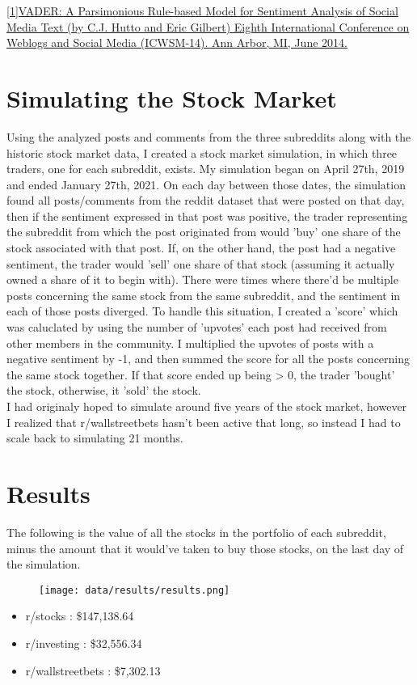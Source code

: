 \documentclass[11pt]{article}
\begin{document}
   \begin{small}
   \href{https://ojs.aaai.org/index.php/ICWSM/article/view/14550/14399}
   {[1]VADER: A Parsimonious Rule-based Model for Sentiment Analysis of Social Media Text
   (by C.J. Hutto and Eric Gilbert)
   Eighth International Conference on Weblogs and Social Media (ICWSM-14). Ann Arbor, MI, June 2014.}
   \end{small}
\section{Simulating the Stock Market}
    Using the analyzed posts and comments from the three subreddits along with
    the historic stock market data, I created a stock market simulation, in
    which three traders, one for each subreddit, exists. My simulation began on
    April 27th, 2019 and ended January 27th, 2021. On each day between those
    dates, the simulation found all posts/comments from the reddit dataset
    that were posted on that day, then if the sentiment expressed in that
    post was positive, the trader representing the subreddit from which the
    post originated from would 'buy' one share of the stock associated with
    that post. If, on the other hand, the post had a negative sentiment, the
    trader would 'sell' one share of that stock (assuming it actually owned a
    share of it to begin with). There were times where there'd be multiple
    posts concerning the same stock from the same subreddit, and the sentiment
    in each of those posts diverged. To handle this situation, I created a
    'score' which was caluclated by using the number of 'upvotes' each post
    had received from other members in the community. I multiplied the upvotes
    of posts with a negative sentiment by -1, and then summed the score for
    all the posts concerning the same stock together. If that score ended up
    being > 0, the trader 'bought' the stock, otherwise, it 'sold' the stock.\\

    I had originaly hoped to simulate around five years of the stock market,
    however I realized that r/wallstreetbets hasn't been active that long, so
    instead I had to scale back to simulating 21 months.
\section{Results}
    The following is the value of all the stocks in the portfolio of each
    subreddit, minus the amount that it would've taken to buy those stocks,
    on the last day of the simulation.\\
    \begin{figure}
	\centering
	\texttt{[image: data/results/results.png]}
    \end{figure}
    \begin{itemize}
	\item r/stocks : \$147,138.64
	\item r/investing : \$32,556.34
	\item r/wallstreetbets : \$7,302.13
    \end{itemize}
\end{document}
